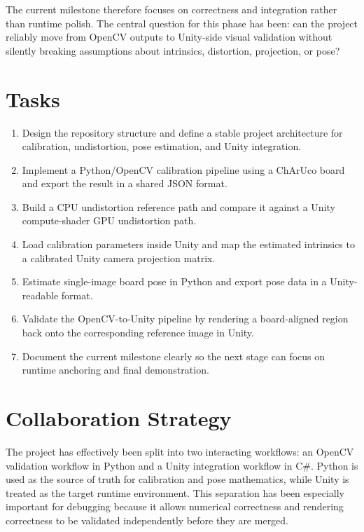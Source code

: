 \documentclass[10pt,twocolumn,letterpaper]{article}
\begin{document}
The current milestone therefore focuses on correctness and integration rather than runtime polish. The central question for this phase has been: can the project reliably move from OpenCV outputs to Unity-side visual validation without silently breaking assumptions about intrinsics, distortion, projection, or pose?

\section{Tasks}
\label{sec:roles}

\begin{enumerate}
\item Design the repository structure and define a stable project architecture for calibration, undistortion, pose estimation, and Unity integration.
\item Implement a Python/OpenCV calibration pipeline using a ChArUco board and export the result in a shared JSON format.
\item Build a CPU undistortion reference path and compare it against a Unity compute-shader GPU undistortion path.
\item Load calibration parameters inside Unity and map the estimated intrinsics to a calibrated Unity camera projection matrix.
\item Estimate single-image board pose in Python and export pose data in a Unity-readable format.
\item Validate the OpenCV-to-Unity pipeline by rendering a board-aligned region back onto the corresponding reference image in Unity.
\item Document the current milestone clearly so the next stage can focus on runtime anchoring and final demonstration.
\end{enumerate}

\section{Collaboration Strategy}

The project has effectively been split into two interacting workflows: an OpenCV validation workflow in Python and a Unity integration workflow in C\#. Python is used as the source of truth for calibration and pose mathematics, while Unity is treated as the target runtime environment. This separation has been especially important for debugging because it allows numerical correctness and rendering correctness to be validated independently before they are merged.
\end{document}
